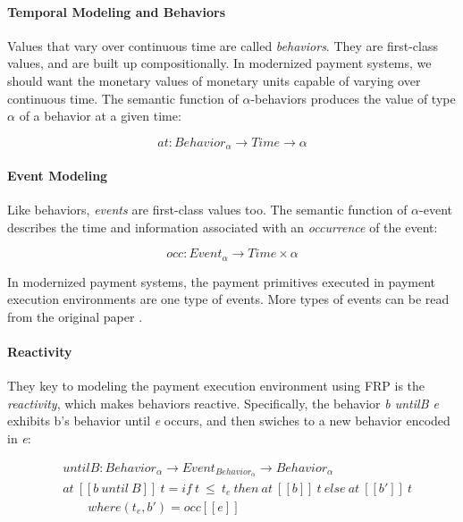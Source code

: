 \paragraph{Temporal Modeling and Behaviors}

Values that vary over continuous time are called \textit{behaviors}. They are first-class values,
and are built up compositionally. In modernized payment systems, we should want the monetary values
of monetary units capable of varying over continuous time. The semantic function of
$\alpha$-behaviors produces the value of type $\alpha$ of a behavior at a given time:

\begin{equation}
    at : Behavior_{\alpha} \rightarrow Time \rightarrow \alpha
\end{equation}

\paragraph{Event Modeling}

Like behaviors, \textit{events} are first-class values too. The semantic function of $\alpha$-event
describes the time and information associated with an \textit{occurrence} of the event:

\begin{equation}
    occ : Event_{\alpha} \rightarrow Time \times \alpha
\end{equation}

In modernized payment systems, the payment primitives executed in payment execution environments are
one type of events. More types of events can be read from the original paper .

\paragraph{Reactivity}

They key to modeling the payment execution environment using FRP is the \textit{reactivity}, which
makes behaviors reactive. Specifically, the behavior \textit{b untilB e} exhibits b's behavior
until \textit{e} occurs, and then swiches to a new behavior encoded in \textit{e}:

\begin{equation}
    \begin{split}
    &untilB : Behavior_{\alpha} \rightarrow Event_{Behavior_{\alpha}} \rightarrow Behavior_{\alpha} \\
    &at\ [\![b\ until\ B]\!]\ t = if\ t\ \leq\ t_{e}\ then\ at\ [\![b]\!]\ t\ else\ at\ [\![b']\!]\ t \\
    &\qquad where (t_e, b') = occ[\![e]\!]
    \end{split}
\end{equation}


